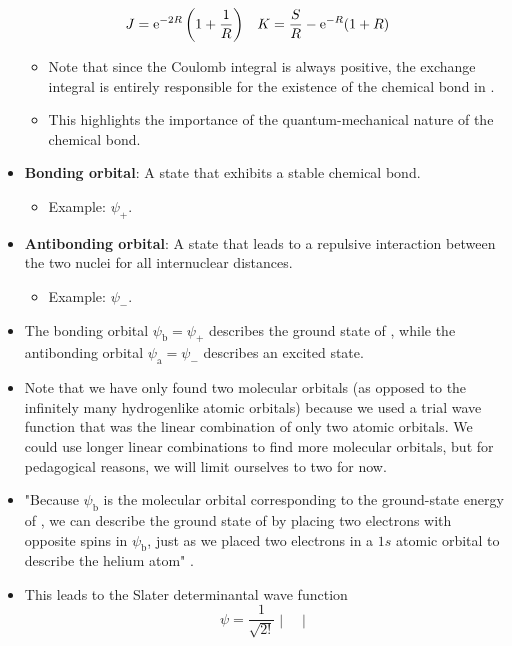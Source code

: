 \documentclass[../notes.tex]{subfiles}
\begin{document}
\begin{itemize}
    \begin{align*}
        J &= \e[-2R]\left( 1+\frac{1}{R} \right)&
        K &= \frac{S}{R}-\e[-R](1+R)
    \end{align*}
    \begin{itemize}
        \item Note that since the Coulomb integral is always positive, the exchange integral is entirely responsible for the existence of the chemical bond in .
        \item This highlights the importance of the quantum-mechanical nature of the chemical bond.
    \end{itemize}
    \item \textbf{Bonding orbital}: A state that exhibits a stable chemical bond.
    \begin{itemize}
        \item Example: $\psi_+$.
    \end{itemize}
    \item \textbf{Antibonding orbital}: A state that leads to a repulsive interaction between the two nuclei for all internuclear distances.
    \begin{itemize}
        \item Example: $\psi_-$.
    \end{itemize}
    \item The bonding orbital $\psi_\text{b}=\psi_+$ describes the ground state of , while the antibonding orbital $\psi_\text{a}=\psi_-$ describes an excited state.
    \item Note that we have only found two molecular orbitals (as opposed to the infinitely many hydrogenlike atomic orbitals) because we used a trial wave function that was the linear combination of only two atomic orbitals. We could use longer linear combinations to find more molecular orbitals, but for pedagogical reasons, we will limit ourselves to two for now.
    \item "Because $\psi_\text{b}$ is the molecular orbital corresponding to the ground-state energy of , we can describe the ground state of  by placing two electrons with opposite spins in $\psi_\text{b}$, just as we placed two electrons in a $1s$ atomic orbital to describe the helium atom" \parencite[336]{bib:McQuarrieSimon}.
    \item This leads to the Slater determinantal wave function
    \begin{equation*}
        \psi = \frac{1}{\sqrt{2!}}
        \begin{vmatrix}

\end{vmatrix}
\end{equation*}
\end{itemize}
\end{document}
